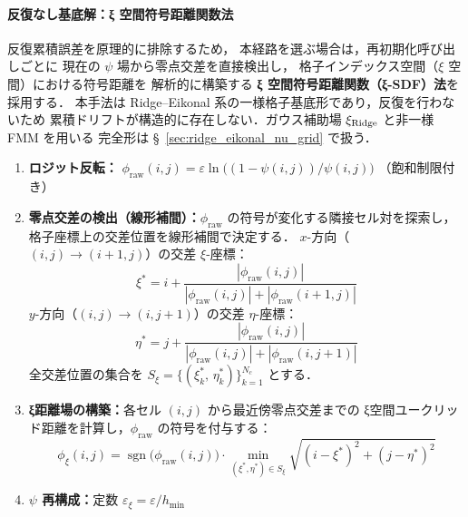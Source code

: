 \paragraph*{反復なし基底解：ξ 空間符号距離関数法}
反復累積誤差を原理的に排除するため，
本経路を選ぶ場合は，再初期化呼び出しごとに
現在の $\psi$ 場から零点交差を直接検出し，
格子インデックス空間（$\xi$ 空間）における符号距離を
解析的に構築する \textbf{ξ 空間符号距離関数（ξ-SDF）法}を採用する．
本手法は Ridge--Eikonal 系の一様格子基底形であり，反復を行わないため
累積ドリフトが構造的に存在しない．ガウス補助場 $\xi_{\text{Ridge}}$ と非一様 FMM を用いる
完全形は §~\ref{sec:ridge_eikonal_nu_grid} で扱う．

\begin{tcolorbox}[algbox, title={ξ-SDF 再初期化アルゴリズム}]
\begin{enumerate}
  \item \textbf{ロジット反転：}
        $\phi_{\mathrm{raw}}(i,j) = \varepsilon\ln\!\bigl((1{-}\psi(i,j))/\psi(i,j)\bigr)$
        （飽和制限付き）
  \item \textbf{零点交差の検出（線形補間）：}$\phi_{\mathrm{raw}}$ の符号が変化する隣接セル対を探索し，
        格子座標上の交差位置を線形補間で決定する．
        $x$-方向（$(i,j)\to(i{+}1,j)$）の交差 $\xi$-座標：
        \begin{equation}
          \xi^* = i + \frac{|\phi_{\mathrm{raw}}(i,j)|}{|\phi_{\mathrm{raw}}(i,j)| + |\phi_{\mathrm{raw}}(i{+}1,j)|}
          \label{eq:xi_crossing_x}
        \end{equation}
        $y$-方向（$(i,j)\to(i,j{+}1)$）の交差 $\eta$-座標：
        \begin{equation}
          \eta^* = j + \frac{|\phi_{\mathrm{raw}}(i,j)|}{|\phi_{\mathrm{raw}}(i,j)| + |\phi_{\mathrm{raw}}(i,j{+}1)|}
          \label{eq:xi_crossing_y}
        \end{equation}
        全交差位置の集合を $S_\xi = \{(\xi^*_k,\,\eta^*_k)\}_{k=1}^{N_c}$ とする．
  \item \textbf{ξ距離場の構築：}各セル $(i,j)$ から最近傍零点交差までの
        ξ空間ユークリッド距離を計算し，$\phi_{\mathrm{raw}}$ の符号を付与する：
        \begin{equation}
          \phi_\xi(i,j) = \operatorname{sgn}\!\bigl(\phi_{\mathrm{raw}}(i,j)\bigr)
          \cdot \min_{(\xi^*,\eta^*)\in S_\xi}
          \sqrt{(i-\xi^*)^2 + (j-\eta^*)^2}
          \label{eq:xi_sdf}
        \end{equation}
  \item \textbf{$\psi$ 再構成：}定数 $\varepsilon_\xi = \varepsilon/h_{\min}$

\end{enumerate}
\end{tcolorbox}
